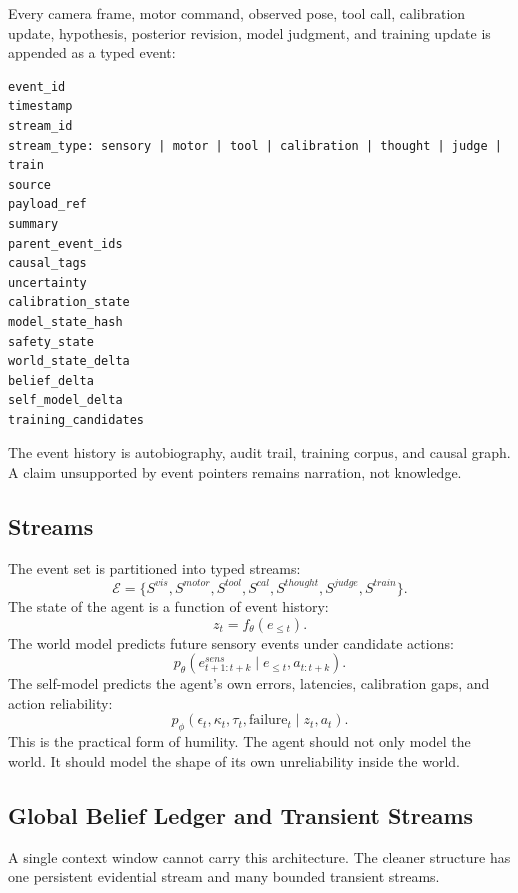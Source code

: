 \documentclass[11pt]{article}
\newcommand{\E}{\mathcal{E}}
\begin{document}
Every camera frame, motor command, observed pose, tool call, calibration update, hypothesis, posterior revision, model judgment, and training update is appended as a typed event:

\begin{lstlisting}
event_id
timestamp
stream_id
stream_type: sensory | motor | tool | calibration | thought | judge | train
source
payload_ref
summary
parent_event_ids
causal_tags
uncertainty
calibration_state
model_state_hash
safety_state
world_state_delta
belief_delta
self_model_delta
training_candidates
\end{lstlisting}

The event history is autobiography, audit trail, training corpus, and causal graph. A claim unsupported by event pointers remains narration, not knowledge.

\subsection{Streams}

The event set is partitioned into typed streams:
\begin{equation}
  \E=\{S^{vis},S^{motor},S^{tool},S^{cal},S^{thought},S^{judge},S^{train}\}.
\end{equation}
The state of the agent is a function of event history:
\begin{equation}
  z_t=f_\theta(e_{\le t}).
\end{equation}
The world model predicts future sensory events under candidate actions:
\begin{equation}
  p_\theta(e^{sens}_{t+1:t+k}\mid e_{\le t},a_{t:t+k}).
\end{equation}
The self-model predicts the agent's own errors, latencies, calibration gaps, and action reliability:
\begin{equation}
  p_\phi(\epsilon_t,\kappa_t,\tau_t,\mathrm{failure}_t\mid z_t,a_t).
\end{equation}
This is the practical form of humility. The agent should not only model the world. It should model the shape of its own unreliability inside the world.

\subsection{Global Belief Ledger and Transient Streams}

A single context window cannot carry this architecture. The cleaner structure has one persistent evidential stream and many bounded transient streams.
\end{document}
